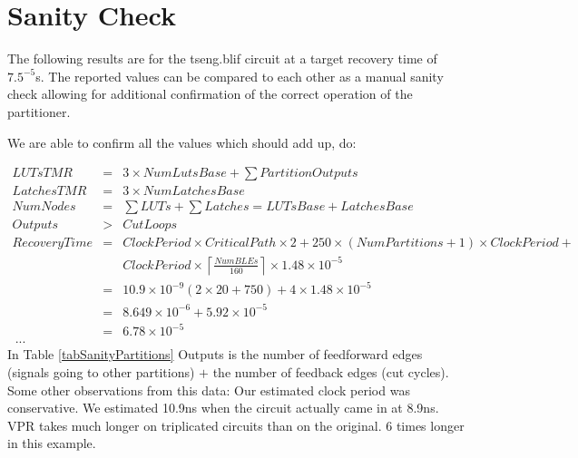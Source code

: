 \documentclass[12pt,final,oneside]{dwThesis} %
\begin{document}
   \section{Sanity Check}
   \label{resSanity} The following results are for the
   tseng.blif circuit at a target recovery time of $7.5^{-5}$s. The reported
   values can be compared to each other as a manual sanity check allowing for
   additional confirmation of the correct operation of the partitioner.

   We are able to confirm all the values which should add up, do:

   \begin{eqnarray*}
      LUTsTMR &=& 3\times NumLutsBase + \sum PartitionOutputs\\
      LatchesTMR &=&  3\times NumLatchesBase\\
      NumNodes &=& \sum LUTs+\sum
      Latches = LUTsBase+LatchesBase\\
      Outputs &>& CutLoops\\
      RecoveryTime &=&
      ClockPeriod\times CriticalPath\times 2 + 250\times(NumPartitions+1)\times
      ClockPeriod + \\
      & &ClockPeriod\times \left\lceil
      \frac{NumBLEs}{160}\right\rceil\times 1.48\times10^{-5}\\
      &=&
      10.9\times10^{-9}(2\times20+750)+4\times1.48\times10^{-5}\\
      &=&
      8.649\times10^{-6}+5.92\times10^{-5}\\
      &=& 6.78\times10^{-5}\\
      \ ...
   \end{eqnarray*}
    In Table \ref{tabSanityPartitions}
   Outputs is the number of feedforward edges (signals going to other
   partitions) $+$ the number of feedback edges (cut cycles).   Some other observations
   from this data: Our estimated clock period was conservative. We estimated
   10.9ns when the circuit actually came in at 8.9ns.  \gls{VPR} takes much
   longer on triplicated circuits than on the original. 6 times longer in this
   example.  
\end{document}
